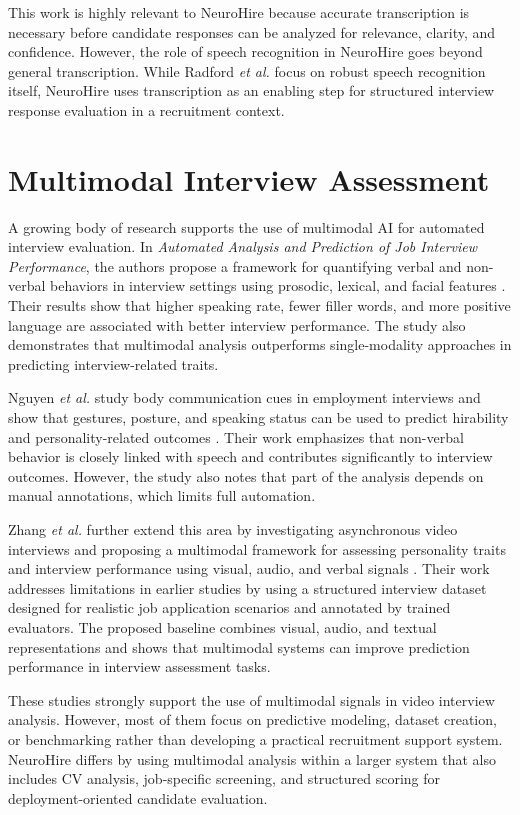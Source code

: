 This work is highly relevant to NeuroHire because accurate transcription is necessary before candidate responses can be analyzed for relevance, clarity, and confidence. However, the role of speech recognition in NeuroHire goes beyond general transcription. While Radford \textit{et al.} focus on robust speech recognition itself, NeuroHire uses transcription as an enabling step for structured interview response evaluation in a recruitment context.

\section{Multimodal Interview Assessment}
A growing body of research supports the use of multimodal AI for automated interview evaluation. In \textit{Automated Analysis and Prediction of Job Interview Performance}, the authors propose a framework for quantifying verbal and non-verbal behaviors in interview settings using prosodic, lexical, and facial features \cite{naim2015jobinterview}. Their results show that higher speaking rate, fewer filler words, and more positive language are associated with better interview performance. The study also demonstrates that multimodal analysis outperforms single-modality approaches in predicting interview-related traits.

Nguyen \textit{et al.} study body communication cues in employment interviews and show that gestures, posture, and speaking status can be used to predict hirability and personality-related outcomes \cite{nguyen2013bodycommunication}. Their work emphasizes that non-verbal behavior is closely linked with speech and contributes significantly to interview outcomes. However, the study also notes that part of the analysis depends on manual annotations, which limits full automation.

Zhang \textit{et al.} further extend this area by investigating asynchronous video interviews and proposing a multimodal framework for assessing personality traits and interview performance using visual, audio, and verbal signals \cite{zhang2025avi}. Their work addresses limitations in earlier studies by using a structured interview dataset designed for realistic job application scenarios and annotated by trained evaluators. The proposed baseline combines visual, audio, and textual representations and shows that multimodal systems can improve prediction performance in interview assessment tasks.

These studies strongly support the use of multimodal signals in video interview analysis. However, most of them focus on predictive modeling, dataset creation, or benchmarking rather than developing a practical recruitment support system. NeuroHire differs by using multimodal analysis within a larger system that also includes CV analysis, job-specific screening, and structured scoring for deployment-oriented candidate evaluation.


